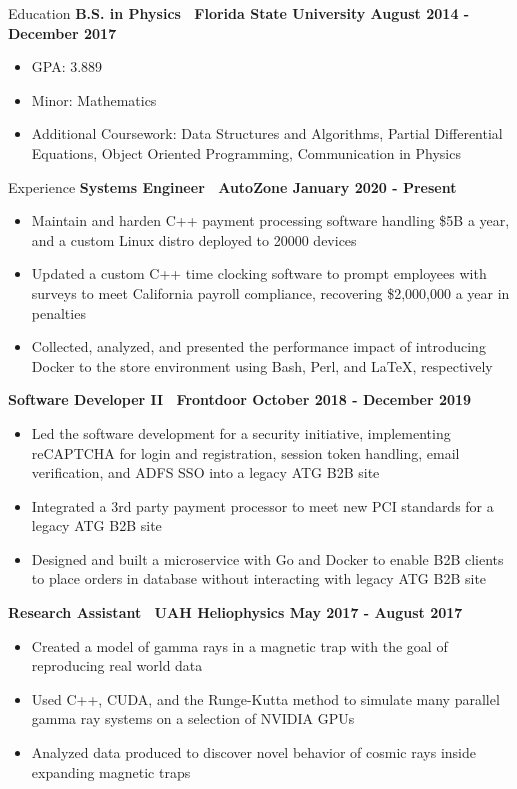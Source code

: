 \documentclass{resume} %
\begin{document}
\begin{rSection}{Education}
    {\bf B.S. in Physics \textbar\ Florida State University \hfill August 2014 - December 2017}
    \begin{itemize}
        \item GPA: 3.889
        \item Minor: Mathematics
        \item Additional Coursework: Data Structures and Algorithms, Partial Differential Equations, Object Oriented Programming, Communication in Physics
    \end{itemize}
\end{rSection}

\begin{rSection}{Experience}
    {\bf Systems Engineer \textbar\ AutoZone \hfill January 2020 - Present}
    \begin{itemize}
        \item Maintain and harden C++ payment processing software handling \$5B a year, and a custom Linux distro deployed to 20000 devices
        \item Updated a custom C++ time clocking software to prompt employees with surveys to meet California payroll compliance, recovering \$2,000,000 a year in penalties
        \item Collected, analyzed, and presented the performance impact of introducing Docker to the store environment using Bash, Perl, and \LaTeX, respectively
    \end{itemize}

    {\bf Software Developer II \textbar\ Frontdoor \hfill October 2018 - December 2019}
    \begin{itemize}
        \item Led the software development for a security initiative, implementing reCAPTCHA for login and registration, session token handling, email verification, and ADFS SSO into a legacy ATG B2B site
        \item Integrated a 3rd party payment processor to meet new PCI standards for a legacy ATG B2B site
        \item Designed and built a microservice with Go and Docker to enable B2B clients to place orders in database without interacting with legacy ATG B2B site
    \end{itemize}
    
    {\bf Research Assistant \textbar\ UAH Heliophysics \hfill May 2017 - August 2017}
    \begin{itemize}
        \item Created a model of gamma rays in a magnetic trap with the goal of reproducing real world data
        \item Used C++, CUDA, and the Runge-Kutta method to simulate many parallel gamma ray systems on a selection of NVIDIA GPUs
        \item Analyzed data produced to discover novel behavior of cosmic rays inside expanding magnetic traps
    \end{itemize}
    

\end{rSection}
\end{document}
